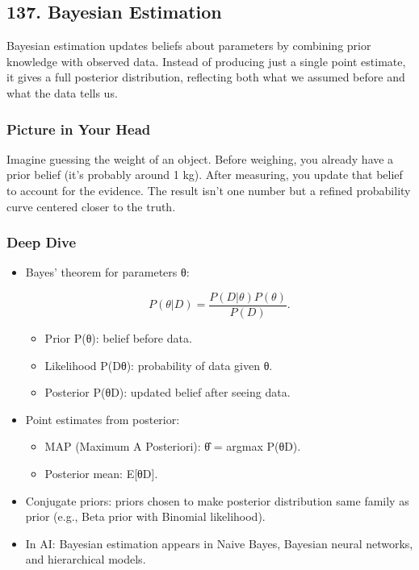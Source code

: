 \documentclass[
  letterpaper,
  DIV=11,
  numbers=noendperiod]{scrreprt}
\providecommand{\tightlist}{%
  \setlength{\itemsep}{0pt}\setlength{\parskip}{0pt}}
\begin{document}
\subsection{137. Bayesian Estimation}\label{bayesian-estimation}

Bayesian estimation updates beliefs about parameters by combining prior
knowledge with observed data. Instead of producing just a single point
estimate, it gives a full posterior distribution, reflecting both what
we assumed before and what the data tells us.

\subsubsection{Picture in Your Head}\label{picture-in-your-head-136}

Imagine guessing the weight of an object. Before weighing, you already
have a prior belief (it's probably around 1 kg). After measuring, you
update that belief to account for the evidence. The result isn't one
number but a refined probability curve centered closer to the truth.

\subsubsection{Deep Dive}\label{deep-dive-136}

\begin{itemize}
\item
  Bayes' theorem for parameters θ:

  \[
  P(θ|D) = \frac{P(D|θ)P(θ)}{P(D)}.
  \]

  \begin{itemize}
  \tightlist
  \item
    Prior P(θ): belief before data.
  \item
    Likelihood P(D\textbar θ): probability of data given θ.
  \item
    Posterior P(θ\textbar D): updated belief after seeing data.
  \end{itemize}
\item
  Point estimates from posterior:

  \begin{itemize}
  \tightlist
  \item
    MAP (Maximum A Posteriori): θ̂ = argmax P(θ\textbar D).
  \item
    Posterior mean: E{[}θ\textbar D{]}.
  \end{itemize}
\item
  Conjugate priors: priors chosen to make posterior distribution same
  family as prior (e.g., Beta prior with Binomial likelihood).
\item
  In AI: Bayesian estimation appears in Naive Bayes, Bayesian neural
  networks, and hierarchical models.
\end{itemize}
\end{document}
